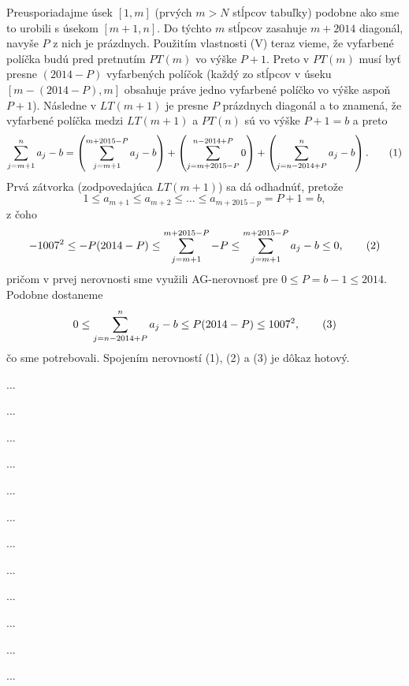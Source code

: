{Preusporiadajme úsek $[1,m]$ (prvých $m>N$ stĺpcov tabuľky) podobne ako sme to urobili s úsekom $[m+1,n]$. Do týchto $m$ stĺpcov zasahuje $m+2014$ diagonál, navyše $P$ z nich je prázdnych. Použitím vlastnosti (V) teraz vieme, že vyfarbené políčka budú pred pretnutím $PT(m)$ vo výške $P+1$. Preto v $PT(m)$ musí byť presne $(2014-P)$ vyfarbených políčok (každý zo stĺpcov v úseku $[m-(2014-P),m]$ obsahuje práve jedno vyfarbené políčko vo výške aspoň $P+1$). Následne v $LT(m+1)$ je presne $P$ prázdnych diagonál a to znamená, že vyfarbené políčka medzi $LT(m+1)$ a $PT(n)$ sú vo výške $P+1=b$ a preto
$$
\sum_{j=m+1}^n a_j-b=
\left(\sum_{j=m+1}^{m+2015-P} a_j-b\right)+
\left(\sum_{j=m+2015-P}^{n-2014+P} 0\right)+
\left(\sum_{j=n-2014+P}^{n} a_j-b\right).
\tag1
$$
Prvá zátvorka (zodpovedajúca $LT(m+1)$) sa dá odhadnúť, pretože
$$
1\le a_{m+1}\le a_{m+2}\le\dots\le a_{m+2015-p}=P+1=b,
$$
z čoho
$$
-1007^2\le -P(2014-P)\le\sum_{j=m+1}^{m+2015-P}-P\le\sum_{j=m+1}^{m+2015-P} a_j-b\le 0,
\tag2
$$
pričom v prvej nerovnosti sme využili AG-nerovnosť pre $0\le P=b-1\le 2014$. Podobne dostaneme
$$
0\le \sum_{j=n-2014+P}^{n} a_j-b\le P(2014-P)\le 1007^2,
\tag3
$$
čo sme potrebovali. Spojením nerovností (1), (2) a (3) je dôkaz hotový.}

{%
...}

{%
...}

{%
...}

{%
...}

{%
...}

{%
...}

{%
...}

{%
...}

{%
...}

{%
...}

{%
...}

{%
...} 